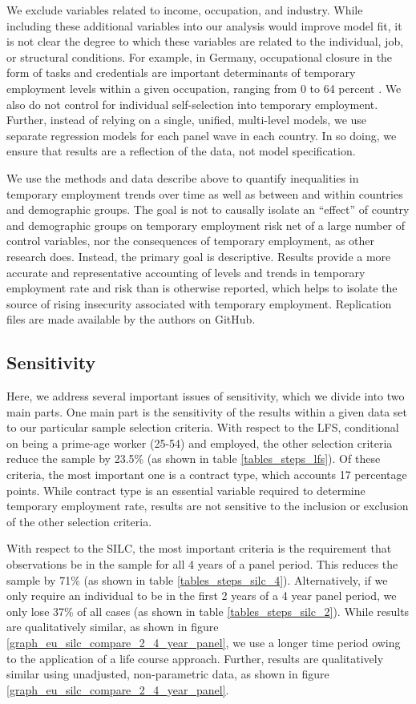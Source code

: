 We exclude variables related to income, occupation, and industry.  While including these additional variables into our analysis would improve model fit, it is not clear the degree to which these variables are related to the individual, job, or structural conditions.  For example, in Germany, occupational closure in the form of tasks and credentials are important determinants of temporary employment levels within a given occupation, ranging from 0 to 64 percent \citep{stuth_2017}.  We also do not control for individual self-selection into temporary employment.  Further, instead of relying on a single, unified, multi-level models, we use separate regression models for each panel wave in each country.  In so doing, we ensure that results are a reflection of the data, not model specification.

We use the methods and data describe above to quantify inequalities in temporary employment trends over time as well as between and within countries and demographic groups.  The goal is not to causally isolate an ``effect'' of country and demographic groups on temporary employment risk net of a large number of control variables, nor the consequences of temporary employment, as other research does.  Instead, the primary goal is descriptive.  Results provide a more accurate and representative accounting of levels and trends in temporary employment rate and risk than is otherwise reported, which helps to isolate the source of rising insecurity associated with temporary employment.  Replication files are made available by the authors on GitHub.

\subsection{Sensitivity}

Here, we address several important issues of sensitivity, which we divide into two main parts.  One main part is the sensitivity of the results within a given data set to our particular sample selection criteria.  With respect to the LFS, conditional on being a prime-age worker (25-54) and employed, the other selection criteria reduce the sample by 23.5\% (as shown in table \ref{tables_steps_lfs}).  Of these criteria, the most important one is a contract type, which accounts 17 percentage points.  While contract type is an essential variable required to determine temporary employment rate, results are not sensitive to the inclusion or exclusion of the other selection criteria.  

With respect to the SILC, the most important criteria is the requirement that observations be in the sample for all 4 years of a panel period.  This reduces the sample by 71\% (as shown in table \ref{tables_steps_silc_4}).  Alternatively, if we only require an individual to be in the first 2 years of a 4 year panel period, we only lose 37\% of all cases (as shown in table \ref{tables_steps_silc_2}).  While results are qualitatively similar, as shown in figure \ref{graph_eu_silc_compare_2_4_year_panel}, we use a longer time period owing to the application of a life course approach.  Further, results are qualitatively similar using unadjusted, non-parametric data, as shown in figure \ref{graph_eu_silc_compare_2_4_year_panel}.  

